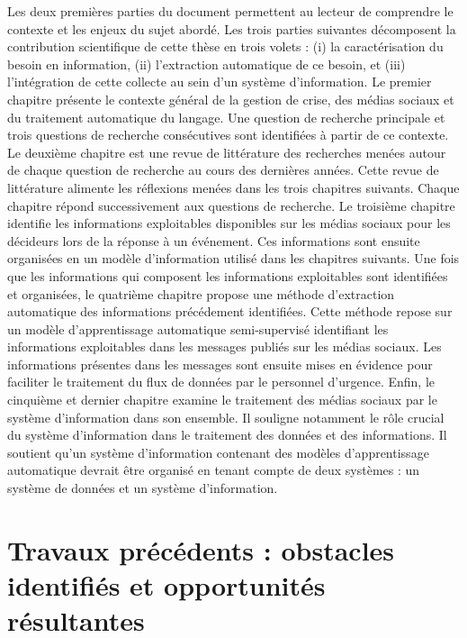 Les deux premières parties du document permettent au lecteur de comprendre le contexte et les enjeux du sujet abordé.
Les trois parties suivantes décomposent la contribution scientifique de cette thèse en trois volets : (i) la caractérisation du besoin en information, (ii) l'extraction automatique de ce besoin, et (iii) l'intégration de cette collecte au sein d'un système d'information.
Le premier chapitre présente le contexte général de la gestion de crise, des médias sociaux et du traitement automatique du langage.
Une question de recherche principale et trois questions de recherche consécutives sont identifiées à partir de ce contexte.
Le deuxième chapitre est une revue de littérature des recherches menées autour de chaque question de recherche au cours des dernières années.
Cette revue de littérature alimente les réflexions menées dans les trois chapitres suivants.
Chaque chapitre répond successivement aux questions de recherche.
Le troisième chapitre identifie les informations exploitables disponibles sur les médias sociaux pour les décideurs lors de la réponse à un événement.
Ces informations sont ensuite organisées en un modèle d'information utilisé dans les chapitres suivants.
Une fois que les informations qui composent les informations exploitables sont identifiées et organisées, le quatrième chapitre propose une méthode d'extraction automatique des informations précédement identifiées.
Cette méthode repose sur un modèle d'apprentissage automatique semi-supervisé identifiant les informations exploitables dans les messages publiés sur les médias sociaux.
Les informations présentes dans les messages sont ensuite mises en évidence pour faciliter le traitement du flux de données par le personnel d'urgence.
Enfin, le cinquième et dernier chapitre examine le traitement des médias sociaux par le système d'information dans son ensemble.
Il souligne notamment le rôle crucial du système d'information dans le traitement des données et des informations.
Il soutient qu'un système d'information contenant des modèles d'apprentissage automatique devrait être organisé en tenant compte de deux systèmes : un système de données et un système d'information.

\section*{Travaux précédents : obstacles identifiés et opportunités résultantes}

